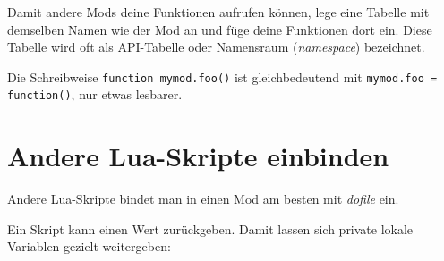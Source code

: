 Damit andere Mods deine Funktionen aufrufen können, lege eine Tabelle
mit demselben Namen wie der Mod an und füge deine Funktionen dort ein.
Diese Tabelle wird oft als API-Tabelle oder
Namensraum (\emph{namespace}) bezeichnet.

\begin{Shaded}
\begin{Highlighting}[]
 \OperatorTok{=} \OperatorTok{\{\}}

 \OperatorTok{(}\OperatorTok{)}
       

\OperatorTok{(}\OperatorTok{)}
\end{Highlighting}
\end{Shaded}

Die Schreibweise \texttt{function mymod.\allowbreak{}foo()} ist
gleichbedeutend mit \texttt{mymod.\allowbreak{}foo = function()}, nur
etwas lesbarer.

\section{Andere Lua-Skripte
einbinden}\label{andere-lua-skripte-einbinden}

Andere Lua-Skripte bindet man in einen Mod am besten mit
\emph{dofile} ein.

\begin{Shaded}
\begin{Highlighting}[]
\OperatorTok{(}\OperatorTok{(}\OperatorTok{)}  \OperatorTok{)}
\end{Highlighting}
\end{Shaded}

Ein Skript kann einen Wert zurückgeben. Damit lassen sich private lokale
Variablen gezielt weitergeben:

\begin{Shaded}
\begin{Highlighting}[]
  \OperatorTok{=} \OperatorTok{\{\}}
 \OperatorTok{=} 
 
\end{Highlighting}
\end{Shaded}


